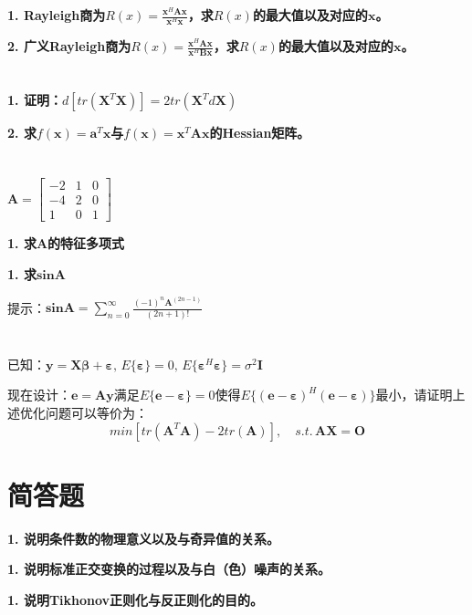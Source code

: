 \documentclass{../source/Paper}
\begin{document}
        \bfseries{1.} Rayleigh商为$R(x) =\displaystyle  \frac{\boldsymbol x ^H \boldsymbol A \boldsymbol x}{\boldsymbol x^H \boldsymbol x}$，求$R(x)$的最大值以及对应的$\boldsymbol x$。

        \bfseries{2.} 广义Rayleigh商为$R(x) = \displaystyle  \frac{\boldsymbol x ^H \boldsymbol A \boldsymbol x}{\boldsymbol x^H \boldsymbol B \boldsymbol x}$，求$R(x)$的最大值以及对应的$\boldsymbol x$。
        
    \section{}
        \bfseries{1.} 证明：$d[tr(\boldsymbol X^T\boldsymbol X)] = 2tr(\boldsymbol X^Td\boldsymbol X)$

        \bfseries{2.} 求$f(\boldsymbol x) = \boldsymbol a^T \boldsymbol x$与$f(\boldsymbol x) = \boldsymbol x^T \boldsymbol A \boldsymbol x$的Hessian矩阵。
    
    \section{}
        $\boldsymbol A  = \begin{bmatrix}
            -2 & 1 & 0 \\
            -4 & 2 & 0 \\
            1 & 0 & 1 
        \end{bmatrix}$

        \bfseries{1.} 求$\boldsymbol A  $的特征多项式

        \bfseries{1.} 求$\boldsymbol {sinA}  $
        
        提示：$\boldsymbol {sinA}   = \sum _{n = 0}^{\infty} \displaystyle  \frac{(-1)^n \boldsymbol A^(2n-1)  }{(2n+1)!}$

    \section{} 
        \begin{center}
            已知：$\boldsymbol y = \boldsymbol X \boldsymbol \beta + \boldsymbol \varepsilon ,\, E\{\boldsymbol \varepsilon \} = 0,\,E\{\boldsymbol \varepsilon ^H \boldsymbol \varepsilon \} = \sigma^2 \boldsymbol I$
        \end{center}

        现在设计：$\boldsymbol e = \boldsymbol A\boldsymbol y$满足$E\{\boldsymbol e - \boldsymbol \varepsilon\} = 0$使得$E\{(\boldsymbol e-\boldsymbol \varepsilon)^H(\boldsymbol e-\boldsymbol \varepsilon)\}$最小，请证明上述优化问题可以等价为：
        $$min[tr(\boldsymbol A^T\boldsymbol A)-2tr(\boldsymbol A)] ,\quad s.t.\, \boldsymbol A\boldsymbol X = \boldsymbol O$$

    \section{简答题} 

    \bfseries{1.} 说明条件数的物理意义以及与奇异值的关系。

    \bfseries{1.} 说明标准正交变换的过程以及与白（色）噪声的关系。

    \bfseries{1.} 说明Tikhonov正则化与反正则化的目的。
\end{document}
